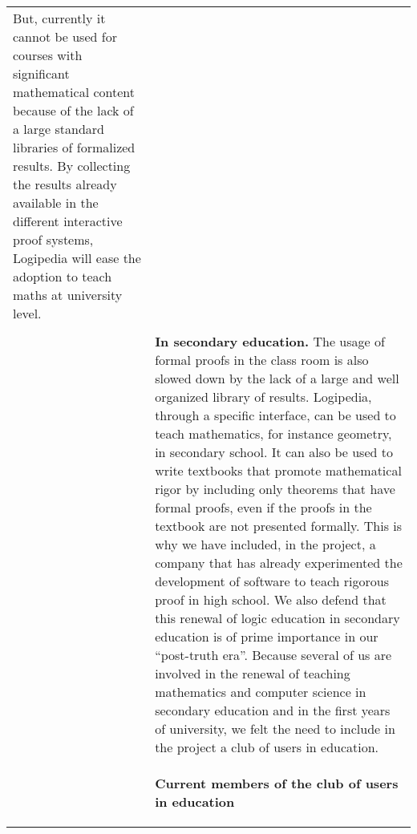 \begin{longtable}{|p{}|p{}|}
But, currently it cannot be used for courses with significant
mathematical content because of the lack of a large standard libraries
of formalized results.  By collecting the results already available in
the different interactive proof systems, Logipedia will ease the
adoption to teach maths at university level.
\\
&\\
&
{\bf In secondary education.}
The usage of formal proofs in the class room is also slowed down by the
lack of a large and well organized library of results.  Logipedia,
through a specific interface, can be used to teach mathematics, for
instance geometry, in secondary school.  It can also be used to write
textbooks that promote mathematical rigor by including only
theorems that have formal proofs, even if the proofs in the textbook
are not presented formally.
This is why we have included, in the project, a company that has
already experimented the development of software to teach rigorous proof
in high school.
We also defend that this renewal of logic education in secondary education
is of prime importance in our ``post-truth era''.
Because several of us are involved in the renewal of teaching
mathematics and computer science in secondary education and in the
first years of university, we felt the need to include in the project
a club of users in education.
\\
&
\begin{framed}
\begin{center}
{\bf \Large Current members of the club of users in education}
\end{center}


\end{framed}
\end{longtable}
